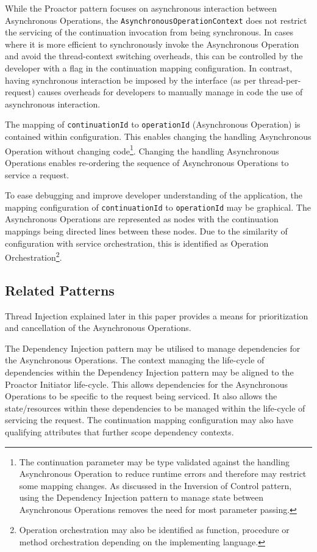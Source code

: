 \documentclass[prodmode]{style/acmlarge}
\begin{document}
While the Proactor pattern focuses on asynchronous interaction between
Asynchronous Operations, the \texttt{AsynchronousOperationContext} does not
restrict the servicing of the continuation invocation from being synchronous.
In cases where it is more efficient to synchronously invoke the Asynchronous
Operation and avoid the thread-context switching overheads, this can be
controlled by the developer with a flag in the continuation mapping
configuration.  In contrast, having synchronous interaction be imposed by the
interface (as per thread-per-request) causes overheads for developers to
manually manage in code the use of asynchronous interaction.

The mapping of \texttt{continuationId} to \texttt{operationId} (Asynchronous
Operation) is contained within configuration.  This enables changing the
handling Asynchronous Operation without changing code\footnote{The continuation
parameter may be type validated against the handling Asynchronous Operation to
reduce runtime errors and therefore may restrict some mapping changes.  As
discussed in the Inversion of Control pattern, using the Dependency Injection
pattern to manage state between Asynchronous Operations removes the need for
most parameter passing.}.  Changing the handling Asynchronous Operations enables
re-ordering the sequence of Asynchronous Operations to service a request.

To ease debugging and improve developer understanding of the application, the
mapping configuration of \texttt{continuationId}  to \texttt{operationId} may be
graphical.  The Asynchronous Operations are represented as nodes with the
continuation mappings being directed lines between these nodes.  Due to the
similarity of configuration with service orchestration, this is identified
as Operation Orchestration\footnote{Operation orchestration may also be
identified as function, procedure or method orchestration depending on the
implementing language.}.


\subsection{Related Patterns}

Thread Injection explained later in this paper provides a means for
prioritization and cancellation of the Asynchronous Operations.

The Dependency Injection pattern \cite{ioc} may be utilised to manage
dependencies for the Asynchronous Operations.  The context managing the
life-cycle of dependencies within the Dependency Injection pattern may be
aligned to the Proactor Initiator life-cycle.  This allows dependencies for the
Asynchronous Operations to be specific to the request being serviced.  It also
allows the state/resources within these dependencies to be managed within the
life-cycle of servicing the request.  The continuation mapping configuration may
also have qualifying attributes that further scope dependency contexts.
\end{document}
